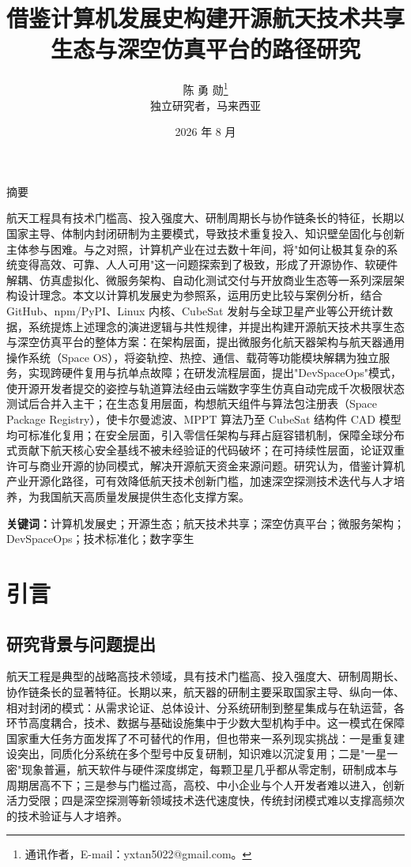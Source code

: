 \documentclass[UTF8,a4paper,zihao=-4]{ctexart}
\title{\heiti\LARGE 借鉴计算机发展史构建开源航天技术共享生态与深空仿真平台的路径研究}
\author{陈 勇 勋\thanks{通讯作者，E-mail：yxtan5022@gmail.com。}\\
\small 独立研究者，马来西亚}
\date{2026 年 8 月}
\begin{document}
\maketitle
\vspace{-2em}

\begin{center}
{\large\heiti 摘\quad 要}
\end{center}
\noindent 航天工程具有技术门槛高、投入强度大、研制周期长与协作链条长的特征，长期以国家主导、体制内封闭研制为主要模式，导致技术重复投入、知识壁垒固化与创新主体参与困难。与之对照，计算机产业在过去数十年间，将"如何让极其复杂的系统变得高效、可靠、人人可用"这一问题探索到了极致，形成了开源协作、软硬件解耦、仿真虚拟化、微服务架构、自动化测试交付与开放商业生态等一系列深层架构设计理念。本文以计算机发展史为参照系，运用历史比较与案例分析，结合 GitHub、npm/PyPI、Linux 内核、CubeSat 发射与全球卫星产业等公开统计数据，系统提炼上述理念的演进逻辑与共性规律，并提出构建开源航天技术共享生态与深空仿真平台的整体方案：在架构层面，提出微服务化航天器架构与航天器通用操作系统（Space OS），将姿轨控、热控、通信、载荷等功能模块解耦为独立服务，实现跨硬件复用与抗单点故障；在研发流程层面，提出"DevSpaceOps"模式，使开源开发者提交的姿控与轨道算法经由云端数字孪生仿真自动完成千次极限状态测试后合并入主干；在生态复用层面，构想航天组件与算法包注册表（Space Package Registry），使卡尔曼滤波、MPPT 算法乃至 CubeSat 结构件 CAD 模型均可标准化复用；在安全层面，引入零信任架构与拜占庭容错机制，保障全球分布式贡献下航天核心安全基线不被未经验证的代码破坏；在可持续性层面，论证双重许可与商业开源的协同模式，解决开源航天资金来源问题。研究认为，借鉴计算机产业开源化路径，可有效降低航天技术创新门槛，加速深空探测技术迭代与人才培养，为我国航天高质量发展提供生态化支撑方案。

\vspace{0.5em}
\noindent\textbf{关键词：}计算机发展史；开源生态；航天技术共享；深空仿真平台；微服务架构；DevSpaceOps；技术标准化；数字孪生

\section{引言}
\subsection{研究背景与问题提出}
航天工程是典型的战略高技术领域，具有技术门槛高、投入强度大、研制周期长、协作链条长的显著特征。长期以来，航天器的研制主要采取国家主导、纵向一体、相对封闭的模式：从需求论证、总体设计、分系统研制到整星集成与在轨运营，各环节高度耦合，技术、数据与基础设施集中于少数大型机构手中。这一模式在保障国家重大任务方面发挥了不可替代的作用，但也带来一系列现实挑战：一是重复建设突出，同质化分系统在多个型号中反复研制，知识难以沉淀复用；二是"一星一密"现象普遍，航天软件与硬件深度绑定，每颗卫星几乎都从零定制，研制成本与周期居高不下；三是参与门槛过高，高校、中小企业与个人开发者难以进入，创新活力受限；四是深空探测等新领域技术迭代速度快，传统封闭模式难以支撑高频次的技术验证与人才培养。
\end{document}
